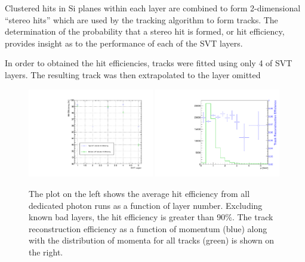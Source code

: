 
%
%
 
Clustered hits in Si planes within each layer are combined to form
2-dimensional ``stereo hits'' which are used by the tracking algorithm to 
form tracks.  The determination of the probability that a stereo hit is 
formed, or hit efficiency, provides insight as to the performance of each of 
the SVT layers.

In order to obtained the hit efficiencies, tracks were fitted using only 4 of 
SVT layers. The resulting track was then extrapolated to the layer omitted
\begin{figure}[h]
    \begin{center}
    	\includegraphics[width=0.49\textwidth]{test2012/svtperformance/trk_performance/hit_efficiency_vs_layer.pdf}
    	\includegraphics[width=0.49\textwidth]{test2012/svtperformance/trk_performance/track_reco_efficiency.pdf}
        \caption{
                    The plot on the left shows the average hit efficiency
                    from all dedicated photon runs as a function of layer
                    number.  Excluding known bad layers, the hit efficiency
                    is greater than 90\%. The track reconstruction efficiency
                    as a function of momentum (blue) along with the 
                    distribution of momenta for all tracks (green) is shown
                    on the right.
                } 
	\label{fig:hit_track_efficiency}
    \end{center}
\end{figure}
